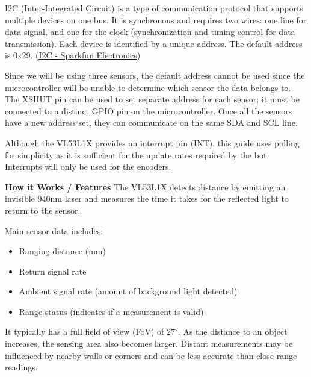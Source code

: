 \documentclass[11pt]{report}
\begin{document}
	\noindent
	I2C (Inter-Integrated Circuit) is a type of communication protocol that supports multiple devices on one bus. 
	It is synchronous and requires two wires: one line for data signal, and one for the clock (synchronization and 
	timing control for data transmission). Each device is identified by a unique address. The default address is 0x29. 
	\newline
	(\href{https://learn.sparkfun.com/tutorials/i2c/all}{I2C - Sparkfun Electronics})
	\newline

	\noindent
	Since we will be using three sensors, the default address cannot be used since the microcontroller will be unable 
	to determine which sensor the data belongs to. The XSHUT pin can be used to set separate address for each sensor; it 
	must be connected to a distinct GPIO pin on the microcontroller. Once all the sensors have a new address set, they 
	can communicate on the same SDA and SCL line. 
	\newline

	\noindent
	Although the VL53L1X provides an interrupt pin (INT), this guide uses polling for simplicity as it is sufficient for the 
	update rates required by the bot. Interrupts will only be used for the encoders.  
	\newline

	\newpage

	\noindent
	\textbf{How it Works / Features}
	\newline
	The VL53L1X detects distance by emitting an invisible 940nm laser and measures the time it takes for the reflected 
	light to return to the sensor. 
	
	\noindent
	Main sensor data includes:
	\begin{itemize}
		\item Ranging distance (mm)
		\item Return signal rate
		\item Ambient signal rate (amount of background light detected)
		\item Range status (indicates if a measurement is valid)
	\end{itemize}

	\noindent
	It typically has a full field of view (FoV) of $27^\circ$. As the distance to an object increases, the sensing area 
	also becomes larger. Distant measurements may be influenced by nearby walls or corners and can be less 
	accurate than close-range readings.
	\newline
\end{document}
